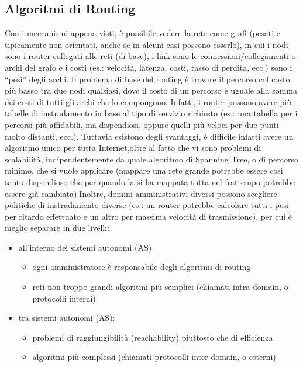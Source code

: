 \subsection{Algoritmi di Routing}
Con i meccanismi appena visti, è possibile vedere la rete come grafi (pesati e tipicamente non orientati, anche se in alcuni casi possono esserlo), in cui i nodi sono i router collegati alle reti (di base), i link sono le connessioni/collegamenti o archi del grafo e i costi (es.: velocità, latenza, costi, tasso di perdita, ecc.) sono i “pesi” degli archi. Il problema di base del routing è trovare il percorso col costo più basso tra due nodi qualsiasi, dove il costo di un percorso è uguale alla somma dei costi di tutti gli archi che lo compongono. Infatti, i router possono avere più tabelle di instradamento in base al tipo di servizio richiesto (es.: una tabella per i percorsi più affidabili, ma dispendiosi, oppure quelli più veloci per due punti molto distanti, ecc.). Tuttavia esistono degli svantaggi, è difficile infatti avere un algoritmo unico per tutta Internet,oltre al fatto che vi sono problemi di scalabilità, indipendentemente da quale algoritmo di Spanning Tree, o di percorso minimo, che si vuole applicare (mappare una rete grande potrebbe essere così tanto dispendioso che per quando la si ha mappata tutta nel frattempo potrebbe essere già cambiata).Inoltre, domini amministrativi diversi possono scegliere politiche di instradamento diverse (es.: un router potrebbe calcolare tutti i pesi per ritardo effettuato e un altro per massima velocità di trasmissione), per cui è meglio separare in due livelli:
\begin{itemize}
  \item all’interno dei sistemi autonomi (AS)
        \begin{itemize}
          \item ogni amministratore è responsabile degli algoritmi di routing
          \item reti non troppo grandi \textrightarrow algoritmi più semplici (chiamati intra-domain, o protocolli interni)
        \end{itemize}
    \item tra sistemi autonomi (AS):
        \begin{itemize}
          \item problemi di raggiungibilità (reachability) piuttosto che di efficienza
          \item algoritmi più complessi (chiamati protocolli inter-domain, o esterni)
        \end{itemize}
\end{itemize}
